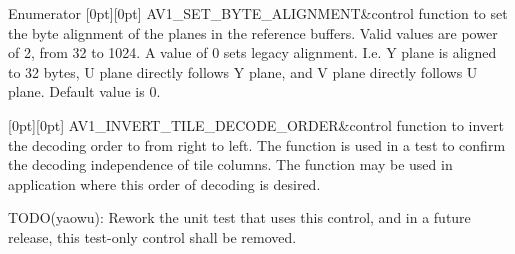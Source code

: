 \begin{DoxyEnumFields}{Enumerator}
[0pt][0pt]{}\mbox{\label{group__aom__decoder_gga3865fd4b3192489baa9a5c3632ebe97babb0f1c97c6092ebed96ca9800e05157e}} 
A\+V1\+\_\+\+S\+E\+T\+\_\+\+B\+Y\+T\+E\+\_\+\+A\+L\+I\+G\+N\+M\+E\+NT&control function to set the byte alignment of the planes in the reference buffers. Valid values are power of 2, from 32 to 1024. A value of 0 sets legacy alignment. I.\+e. Y plane is aligned to 32 bytes, U plane directly follows Y plane, and V plane directly follows U plane. Default value is 0. \\
\hline

[0pt][0pt]{}\mbox{\label{group__aom__decoder_gga3865fd4b3192489baa9a5c3632ebe97bac19ffcb187b1e1b5eee18499a97f69d2}} 
A\+V1\+\_\+\+I\+N\+V\+E\+R\+T\+\_\+\+T\+I\+L\+E\+\_\+\+D\+E\+C\+O\+D\+E\+\_\+\+O\+R\+D\+ER&control function to invert the decoding order to from right to left. The function is used in a test to confirm the decoding independence of tile columns. The function may be used in application where this order of decoding is desired.

T\+O\+D\+O(yaowu)\+: Rework the unit test that uses this control, and in a future release, this test-\/only control shall be removed. \\
\hline


\end{DoxyEnumFields}
